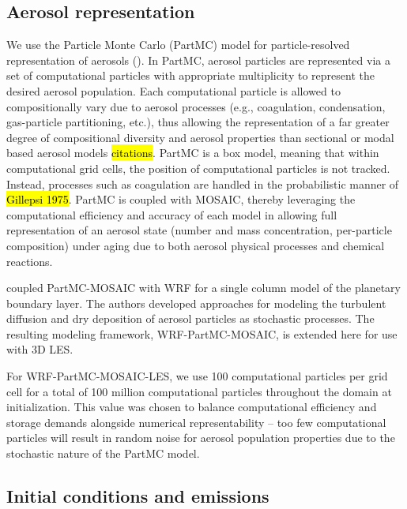 \subsection{Aerosol representation}

We use the Particle Monte Carlo (PartMC) model for particle-resolved representation of aerosols (\cite{riemer_simulating_2009}). In PartMC, aerosol particles are represented via a set of computational particles with appropriate multiplicity to represent the desired aerosol population. Each computational particle is allowed to compositionally vary due to aerosol processes (e.g., coagulation, condensation, gas-particle partitioning, etc.), thus allowing the representation of a far greater degree of compositional diversity and aerosol properties than sectional or modal based aerosol models \hl{citations}. PartMC is a box model, meaning that within computational grid cells, the position of computational particles is not tracked. Instead, processes such as coagulation are handled in the probabilistic manner of \hl{Gillepsi 1975}. PartMC is coupled with MOSAIC, thereby leveraging the computational efficiency and accuracy of each model in allowing full representation of an aerosol state (number and mass concentration, per-particle composition) under aging due to both aerosol physical processes and chemical reactions.

\cite{curtis_single-column_2017} coupled PartMC-MOSAIC with WRF for a single column model of the planetary boundary layer. The authors developed approaches for modeling the turbulent diffusion and dry deposition of aerosol particles as stochastic processes. The resulting modeling framework, WRF-PartMC-MOSAIC, is extended here for use with 3D LES. 

For WRF-PartMC-MOSAIC-LES, we use 100 computational particles per grid cell for a total of 100 million computational particles throughout the domain at initialization. This value was chosen to balance computational efficiency and storage demands alongside numerical representability -- too few computational particles will result in random noise for aerosol population properties due to the stochastic nature of the PartMC model.

\subsection{Initial conditions and emissions}

